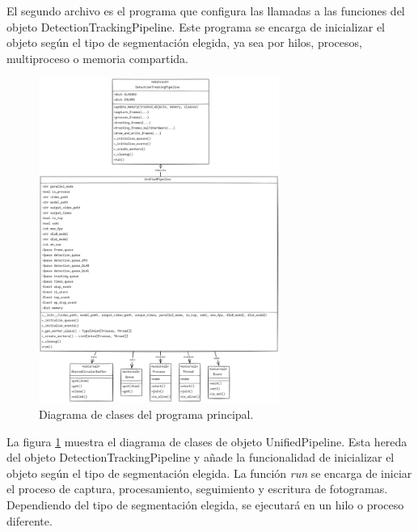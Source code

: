 \documentclass[11pt,spanish,listoffigures,listoftables]{tfgetsinf}
\begin{document}
   


   El segundo archivo es el programa que configura las llamadas a las funciones del objeto DetectionTrackingPipeline. Este programa se encarga de inicializar el objeto según el tipo de segmentación elegida, ya sea por hilos, procesos, multiproceso o memoria compartida. 


   \begin{figure}[H]
      \centering
      \includegraphics[width=0.7\textwidth]{codigo/images/unified_pipeline_uml.png}
      \caption[Diagrama de clases del programa principal]{Diagrama de clases del programa principal.}
      \label{fig:unified_pipeline_uml}
   \end{figure}

   La figura \ref{fig:unified_pipeline_uml} muestra el diagrama de clases de objeto UnifiedPipeline. Esta hereda del objeto DetectionTrackingPipeline y añade la funcionalidad de inicializar el objeto según el tipo de segmentación elegida. La función \textit{run} se encarga de iniciar el proceso de captura, procesamiento, seguimiento y escritura de fotogramas. Dependiendo del tipo de segmentación elegida, se ejecutará en un hilo o proceso diferente. 
\end{document}
